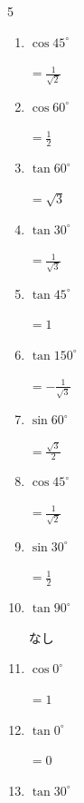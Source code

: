 \begin{multicols}{5}
\begin{enumerate}
        $\displaystyle =-1$

  \item $\displaystyle \cos{45^\circ}$

        $\displaystyle =\frac{1}{\sqrt{2}}$

\columnbreak %

  \item $\displaystyle \cos{60^\circ}$

        $\displaystyle =\frac{1}{2}$

  \item $\displaystyle \tan{60^\circ}$

        $\displaystyle =\sqrt{3}$

  \item $\displaystyle \tan{30^\circ}$

        $\displaystyle =\frac{1}{\sqrt{3}}$

  \item $\displaystyle \tan{45^\circ}$

        $\displaystyle =1$

  \item $\displaystyle \tan{150^\circ}$

        $\displaystyle =-\frac{1}{\sqrt{3}}$

  \item $\displaystyle \sin{60^\circ}$

        $\displaystyle =\frac{\sqrt{3}}{2}$

  \item $\displaystyle \cos{45^\circ}$

        $\displaystyle =\frac{1}{\sqrt{2}}$

  \item $\displaystyle \sin{30^\circ}$

        $\displaystyle =\frac{1}{2}$

  \item $\displaystyle \tan{90^\circ}$

        $\displaystyle なし$

  \item $\displaystyle \cos{0^\circ}$

        $\displaystyle =1$

  \item $\displaystyle \tan{0^\circ}$

        $\displaystyle =0$

  \item $\displaystyle \tan{30^\circ}$


\end{enumerate}
\end{multicols}
